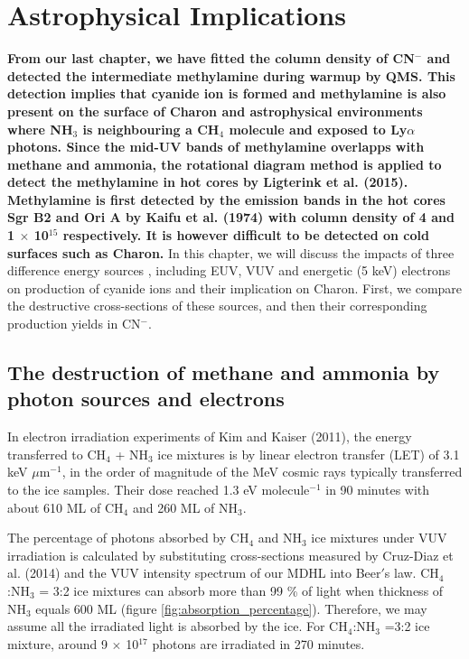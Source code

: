 \chapter{\protect Astrophysical Implications}
\label{astron}

\textbf{From our last chapter, we have fitted the column density of CN$^-$ and detected the intermediate methylamine during warmup by QMS. This detection implies that cyanide ion is formed and methylamine is also present on the surface of Charon and astrophysical environments where NH$_3$ is neighbouring a CH$_4$ molecule and exposed to Ly$\alpha$ photons. Since the mid-UV bands of methylamine overlapps with methane and ammonia, the rotational diagram method is applied to detect the methylamine in hot cores by Ligterink et al. (2015)\cite{ligterink2015search}. Methylamine is first detected by the emission bands in the hot cores Sgr B2 and Ori A by Kaifu et al. (1974)\cite{kaifu1974detection} with column density of 4 and 1 $\times$ 10$^{15}$ respectively. It is however difficult to be detected on cold surfaces such as Charon.} In this chapter, we will discuss the impacts of three difference energy sources , including EUV, VUV and energetic (5 keV) electrons on production of cyanide ions and their implication on Charon. First, we compare the destructive cross-sections of these sources, and then their corresponding production yields in CN$^-$.

\section{The destruction of methane and ammonia by photon sources and electrons}

In electron irradiation experiments of Kim and Kaiser (2011)\cite{kim}, the energy transferred to CH$_4$ + NH$_3$ ice mixtures is by linear electron transfer (LET) of 3.1 keV $\mu$m$^{-1}$, in the order of magnitude of the MeV cosmic rays typically transferred to the ice samples. Their dose reached 1.3 eV molecule$^{-1}$ in 90 minutes with about 610 ML of CH$_4$ and 260 ML of NH$_3$. 

The percentage of photons absorbed by CH$_4$ and NH$_3$ ice mixtures under VUV irradiation is calculated by substituting cross-sections measured by Cruz-Diaz et al. (2014) \cite{cruz2014vacuum} and the VUV intensity spectrum of our MDHL into Beer$'$s law. CH$_4$:NH$_3$ = 3:2 ice mixtures can absorb more than 99 \% of light when thickness of NH$_3$ equals 600 ML (figure \ref{fig:absorption_percentage}). Therefore, we may assume all the irradiated light is absorbed by the ice. For CH$_4$:NH$_3$ =3:2 ice mixture, around 9 $\times$ 10$^{17}$ photons are irradiated in 270 minutes.

